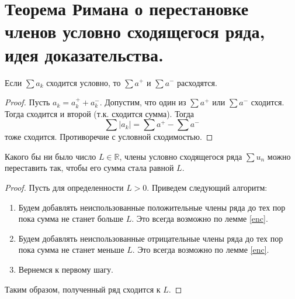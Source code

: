 \section{Теорема Римана о перестановке членов условно сходящегося ряда, идея доказательства.}

\begin{lemma}\label{enc}
    Если $\sum a_k$ сходится условно, то $\sum a^{+}$ и $\sum a^{-}$ расходятся.
    \begin{proof}
        Пусть $a_k = a_k^+ + a_k^-$. Допустим, что один из $\sum a^{+}$ или $\sum a^{-}$ сходится. Тогда сходится и второй (т.к. сходится сумма). Тогда
        \[
            \sum |a_k| = \sum a^{+} - \sum a^{-}
        \] 
        тоже сходится. Противоречие с условной сходимостью.
    \end{proof}
\end{lemma}

\begin{theorem}
    Какого бы ни было число $L \in \mathbb{R}$, члены условно сходящегося ряда $\sum u_n$ можно переставить так, чтобы его сумма стала равной $L$.
    \begin{proof}
        Пусть для определенности $L > 0$. Приведем следующий алгоритм:
        \begin{enumerate}
            \item Будем добавлять неиспользованные положительные члены ряда до тех пор пока сумма не станет больше $L$. Это всегда возможно по лемме \ref{enc}.
            \item Будем добавлять неиспользованные отрицательные члены ряда до тех пор пока сумма не станет меньше $L$. Это всегда возможно по лемме \ref{enc}.
            \item Вернемся к первому шагу.
        \end{enumerate}
        Таким образом, полученный ряд сходится к $L$.
    \end{proof}
\end{theorem}